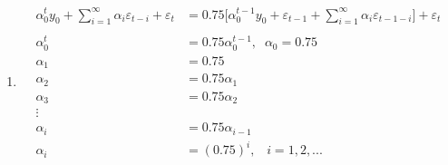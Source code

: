 \begin{enumerate}
\begin{enumerate}
		\item %
		\begin{align*}
			\alpha_0^ty_0+\sum\limits_{i=1}^{\infty}\alpha_i\varepsilon_{t-i}+\varepsilon_t&=0.75\bigg[\alpha_0^{t-1}y_0+\varepsilon_{t-1}+\sum\limits_{i=1}^{\infty}\alpha_i\varepsilon_{t-1-i}\bigg]+\varepsilon_{t}\\
			\\
			\alpha_0^t&=0.75\alpha_0^{t-1},\;\; \alpha_0=0.75\\
			\alpha_1&=0.75\\
			\alpha_2&=0.75\alpha_1\\
			\alpha_3&=0.75\alpha_2\\
			\vdots&\\
			\alpha_i&=0.75\alpha_{i-1}\\
			\alpha_i&=(0.75)^i,\;\;\; i=1,2,...
		\end{align*}
				

\end{enumerate}
\end{enumerate}
